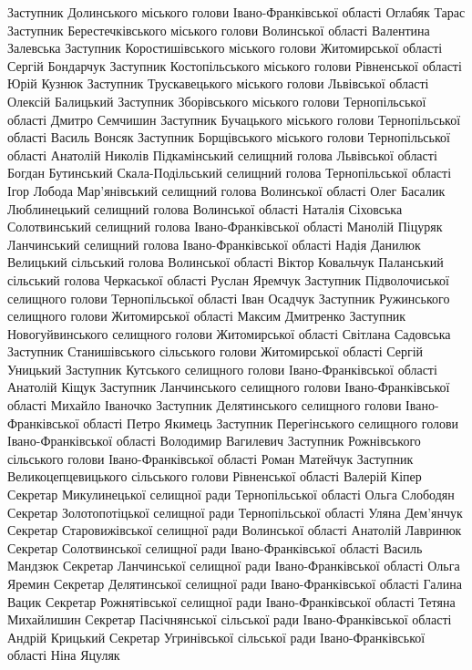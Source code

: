 Заступник Долинського міського голови Івано-Франківської області Оглабяк Тарас
Заступник Берестечківського міського голови Волинської області Валентина Залевська 
Заступник Коростишівського міського голови Житомирської області Сергій Бондарчук
Заступник Костопільського міського голови Рівненської області Юрій Кузнюк
Заступник Трускавецького міського голови Львівської області Олексій Балицький
Заступник Зборівського міського голови Тернопільської області Дмитро Семчишин
Заступник Бучацького міського голови Тернопільської області Василь Вонсяк
Заступник Борщівського міського голови Тернопільської області Анатолій Николів 
Підкамінський селищний голова Львівської області Богдан Бутинський
Скала-Подільський селищний голова Тернопільської області Ігор Лобода
Мар’янівський селищний голова Волинської області Олег Басалик
Люблинецький селищний голова Волинської області Наталія Сіховська
Солотвинський селищний голова Івано-Франківської області Манолій Піцуряк
Ланчинський селищний голова Івано-Франківської області Надія Данилюк
Велицький сільський голова Волинської області Віктор Ковальчук
Паланський сільський голова Черкаської області Руслан Яремчук
Заступник Підволочиської селищного голови Тернопільської області Іван Осадчук
Заступник Ружинського селищного голови Житомирської області Максим Дмитренко
Заступник Новогуйвинського селищного голови Житомирської області Світлана Садовська
Заступник Станишівського сільського голови Житомирської області Сергій Уницький
Заступник Кутського селищного голови Івано-Франківської області Анатолій Кіщук
Заступник Ланчинського селищного голови Івано-Франківської області Михайло Іваночко
Заступник Делятинського селищного голови Івано-Франківської області Петро Якимець
Заступник Перегінського селищного голови Івано-Франківської області Володимир Вагилевич
Заступник Рожнівського сільського голови Івано-Франківської області Роман Матейчук
Заступник Великоцепцевицького сільського голови Рівненської області Валерій Кіпер
Секретар Микулинецької селищної ради Тернопільської області Ольга Слободян
Секретар Золотопотіцької селищної ради Тернопільської області Уляна Дем’янчук
Секретар Старовижівської селищної ради Волинської області Анатолій Лавринюк
Секретар Солотвинської селищної ради Івано-Франківської області Василь Мандзюк
Секретар Ланчинської селищної ради Івано-Франківської області Ольга Яремин
Секретар Делятинської селищної ради Івано-Франківської області Галина Вацик
Секретар Рожнятівської селищної ради Івано-Франківської області Тетяна Михайлишин
Секретар Пасічнянської сільської ради Івано-Франківської області Андрій Крицький
Секретар Угринівської сільської ради Івано-Франківської області Ніна Яцуляк 
